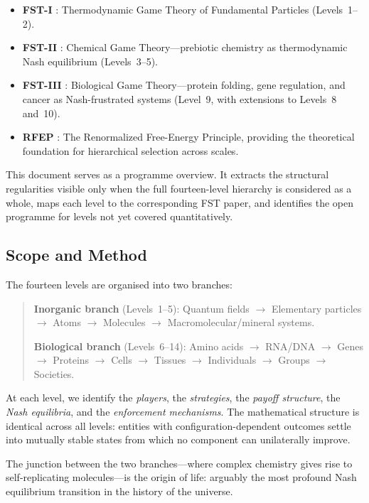 \documentclass[12pt,a4paper]{article}
\theoremstyle{remark}
\begin{document}
\begin{itemize}[leftmargin=2em]
  \item \textbf{FST-I} \citep{Geiger2026a}: Thermodynamic Game Theory of Fundamental Particles (Levels~1--2).
  \item \textbf{FST-II} \citep{Geiger2026b}: Chemical Game Theory---prebiotic chemistry as thermodynamic Nash equilibrium (Levels~3--5).
  \item \textbf{FST-III} \citep{Geiger2026c}: Biological Game Theory---protein folding, gene regulation, and cancer as Nash-frustrated systems (Level~9, with extensions to Levels~8 and~10).
  \item \textbf{RFEP} \citep{GeigerRFEP2026}: The Renormalized Free-Energy Principle, providing the theoretical foundation for hierarchical selection across scales.
\end{itemize}

This document serves as a programme overview. It extracts the structural regularities visible only when the full fourteen-level hierarchy is considered as a whole, maps each level to the corresponding FST paper, and identifies the open programme for levels not yet covered quantitatively.

\subsection{Scope and Method}

The fourteen levels are organised into two branches:

\begin{quote}
\textbf{Inorganic branch} (Levels~1--5): Quantum fields $\to$ Elementary particles $\to$ Atoms $\to$ Molecules $\to$ Macromolecular/mineral systems.

\textbf{Biological branch} (Levels~6--14): Amino acids $\to$ RNA/DNA $\to$ Genes $\to$ Proteins $\to$ Cells $\to$ Tissues $\to$ Individuals $\to$ Groups $\to$ Societies.
\end{quote}

At each level, we identify the \emph{players}, the \emph{strategies}, the \emph{payoff structure}, the \emph{Nash equilibria}, and the \emph{enforcement mechanisms}. The mathematical structure is identical across all levels: entities with configuration-dependent outcomes settle into mutually stable states from which no component can unilaterally improve.

The junction between the two branches---where complex chemistry gives rise to self-replicating molecules---is the origin of life: arguably the most profound Nash equilibrium transition in the history of the universe.
\end{document}
